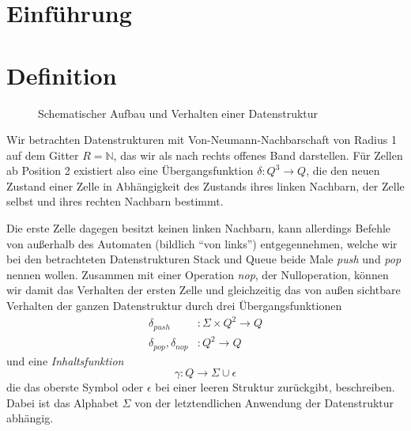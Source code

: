 \documentclass{article}
\begin{document}
\newcommand{\ca}{\ensuremath\mathcal{A}}
\newcommand{\abs}[1]{\lvert#1\rvert}
\newcommand{\ceil}[1]{\lceil#1\rceil}
\newcommand{\zrange}[1]{\mathbb{G}_{#1}}
\newcommand{\bild}[1]{\text{Bild}(#1)}
\newcommand{\N}{\mathbb{N}}
\newcommand{\ve}[3]{\begin{pmatrix}#1\\#2\\#3\end{pmatrix}}

\section{Einführung}

\newpage
\section{Definition}

\begin{figure}
    \centering
    \caption{Schematischer Aufbau und Verhalten einer Datenstruktur}
\end{figure}
Wir betrachten Datenstrukturen mit Von-Neumann-Nachbarschaft von Radius 1 auf dem Gitter $R = \N$, das wir als nach rechts offenes Band darstellen. Für Zellen ab Position 2 existiert also eine Übergangsfunktion $\delta : Q^3 \rightarrow Q$, die den neuen Zustand einer Zelle in Abhängigkeit des Zustands ihres linken Nachbarn, der Zelle selbst und ihres rechten Nachbarn bestimmt.

Die erste Zelle dagegen besitzt keinen linken Nachbarn, kann allerdings Befehle von außerhalb des Automaten (bildlich "`von links"') entgegennehmen, welche wir bei den betrachteten Datenstrukturen Stack und Queue beide Male \emph{push} und \emph{pop} nennen wollen. Zusammen mit einer Operation \emph{nop}, der Nulloperation, können wir damit das Verhalten der ersten Zelle und gleichzeitig das von außen sichtbare Verhalten der ganzen Datenstruktur durch drei Übergangsfunktionen
\begin{align*}
    \delta_{push} &: \Sigma \times Q^2 \rightarrow Q \\
    \delta_{pop}, \delta_{nop} &: Q^2 \rightarrow Q
\end{align*}
und eine \emph{Inhaltsfunktion}
\[ \gamma : Q \rightarrow \Sigma \cup {\epsilon} \]
die das oberste Symbol oder $\epsilon$ bei einer leeren Struktur zurückgibt, beschreiben. Dabei ist das Alphabet $\Sigma$ von der letztendlichen Anwendung der Datenstruktur abhängig.
\end{document}
